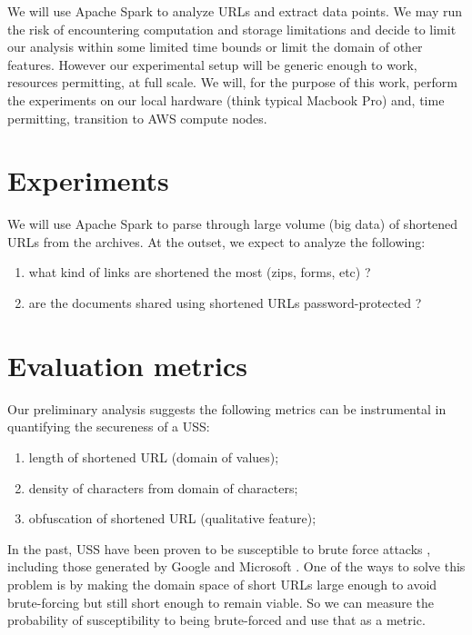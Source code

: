\documentclass[sigconf, nonacm]{acmart}
\begin{document}
We will use Apache Spark to analyze URLs and extract data points. We may run the risk of encountering computation and storage limitations and decide to limit our analysis within some limited time bounds or limit the domain of other features. However our experimental setup will be generic enough to work, resources permitting, at full scale. We will, for the purpose of this work, perform the experiments on our local hardware (think typical Macbook Pro) and, time permitting, transition to AWS compute nodes.

\section{Experiments}

We will use Apache Spark to parse through large volume (big data) of shortened URLs  from the archives. At the outset, we expect to analyze the following:
\begin{enumerate}
    \item what kind of links are shortened the most (zips, forms, etc) ?
    
    \item are the documents shared using shortened URLs password-protected ?
\end{enumerate}

\section{Evaluation metrics}

Our preliminary analysis suggests the following metrics can be instrumental in quantifying the secureness of a USS:
\begin{enumerate}
    \item length of shortened URL (domain of values);
    
    \item density of characters from domain of characters;
    
    \item obfuscation of shortened URL (qualitative feature);
\end{enumerate}

In the past, USS have been proven to be susceptible to brute force attacks \cite{paper1}, including those generated by Google and Microsoft . One of the ways to solve this problem is by making the domain space of short URLs large enough to avoid brute-forcing but still short enough to remain viable. So we can measure the probability of susceptibility to being brute-forced and use that as a metric.
\end{document}
